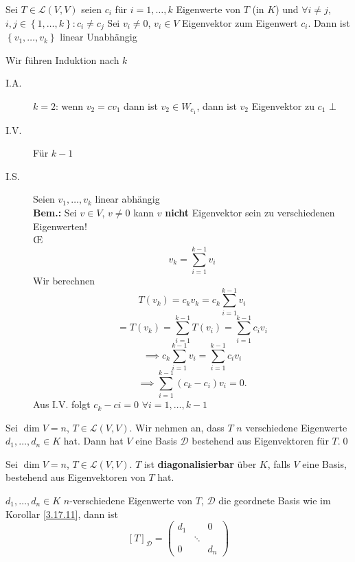 \begin{sublemma}
	Sei $ T \in \mathcal{L} \left( V, V \right)  $ seien $ c_i $ für $ i = 1, \dotsc, k $ Eigenwerte von $ T $ (in $ K $) und $ \forall i \neq j $, $ i, j \in \left\{ 1, \dotsc, k \right\} : c_i \neq c_j $ 
	Sei $ v_i \neq 0 $, $ v_i \in V $ Eigenvektor zum Eigenwert $ c_i $.
	Dann ist $ \left\{ v_1, \dotsc, v_k \right\} $ linear Unabhängig
\end{sublemma}
\begin{subproof*}
	Wir führen Induktion nach $ k $ 
	\begin{description}
		\item[I.A.] $ k = 2 $: wenn $ v_2 = cv_1 $ dann ist $ v_2 \in W_{c_1}  $, dann ist $ v_2 $ Eigenvektor zu $ c_1 $ $ \bot $
		\item[I.V.] Für $ k -1 $ 
		\item[I.S.] Seien $ v_1, \dotsc, v_k $ linear abhängig\\
			\textbf{Bem.:} Sei $ v \in V $, $ v \neq 0 $ kann $ v $ \textbf{nicht} Eigenvektor sein zu verschiedenen Eigenwerten!\\
			\OE{}
			\[
				v_k = \sum_{i=1}^{k - 1} v_i
			\]
			Wir berechnen
			\[
				T(v_k) = c_k v_k = c_k \sum_{i=1}^{k - 1} v_i
			\]
			\[
				= T(v_k) = \sum_{i=1}^{k - 1} T(v_i) = \sum_{i=1}^{k - 1} c_i v_i
			\]
			\[
				\implies c_k \sum_{i=1}^{k - 1} v_i = \sum_{i=1}^{k - 1} c_i v_i
			\]
			\[
				\implies \sum_{i=1}^{k - 1} \left( c_k - c_i \right) v_i = 0.
			\]
			Aus I.V. folgt $ c_k - ci = 0 $ $ \forall i = 1, \dotsc, k - 1 $
	\end{description}
\end{subproof*}

\begin{subcorollary}
	 Sei $ \dim V = n $, $ T \in \mathcal{L} \left( V, V \right)  $.
	 Wir nehmen an, dass $ T $ {\color{gadse-orange}$ n $ verschiedene} Eigenwerte $ d_1, \dotsc, d_n \in K $ hat.
	 Dann hat $ V $ eine Basis $ \mathcal{D}  $ bestehend aus Eigenvektoren für $ T $.\qed
\end{subcorollary}

\begin{subdefinition}
	Sei $ \dim V = n $, $ T \in \mathcal{L} \left( V, V \right)  $.
	$ T $ ist \textbf{diagonalisierbar} über $ K $, falls $ V $ eine Basis, bestehend aus Eigenvektoren von $ T $ hat.
\end{subdefinition}

\begin{subnote}
	$ d_1, \dotsc, d_n \in K $ $ n $-verschiedene Eigenwerte von $ T $, $ \mathcal{D}  $ die geordnete Basis wie im Korollar \ref{3.17.11}, dann ist
	\[
		[T]_{\mathcal{D} } = \begin{pmatrix} d_1 & & 0 \\ & \ddots & \\ 0 & & d_n \end{pmatrix} 
	\]
\end{subnote}

